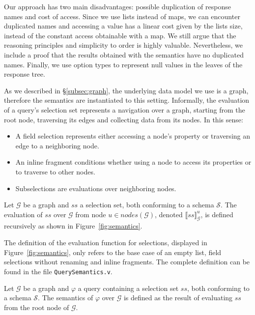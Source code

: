  Our approach has two main disadvantages: possible duplication of response names and cost of access. Since we use lists instead of maps, we can encounter duplicated names and accessing a value has a linear cost given by the lists size, instead of the constant access obtainable with a map. We still argue that the reasoning principles and simplicity to order is highly valuable. Nevertheless, we include a proof that the results obtained with the semantics have no duplicated names. Finally, we use option types to represent null values in the leaves of the response tree.



As we described in \S\ref{subsec:graph}, the underlying data model we use is a graph, therefore the semantics are instantiated to this setting. %
Informally, the evaluation of a query's selection set represents a navigation over a graph, starting from the root node, traversing its edges and collecting data from its nodes. In this sense:
\begin{itemize}
    \item A field selection represents either accessing a node's property or traversing an edge to a neighboring node.
    \item An inline fragment conditions whether using a node to access its properties or to traverse to other nodes.
    \item Subselections are evaluations over neighboring nodes.
\end{itemize}

\begin{definition}
Let $\mathcal{G}$ be a graph and $ss$ a selection set, both conforming to a schema $\mathcal{S}$. The evaluation of $ss$ over $\mathcal{G}$ from node $u \in \mathit{nodes}(\mathcal{G})$, denoted $\llbracket ss \rrbracket^{u}_{\mathcal{G}}$, is defined recursively as shown in Figure~\ref{fig:semantics}. 
\end{definition}

The definition of the evaluation function for selections, displayed in Figure~\ref{fig:semantics}, only refers to the base case of an empty list, field selections without renaming and inline fragments. The complete definition can be found in the file \texttt{QuerySemantics.v}.

\begin{definition}
Let $\mathcal{G}$ be a graph and $\varphi$ a query containing a selection set $ss$, both conforming to a schema $\mathcal{S}$. The semantics of $\varphi$ over $\mathcal{G}$ is defined as the result of evaluating $ss$ from the root node of $\mathcal{G}$.
\end{definition}


